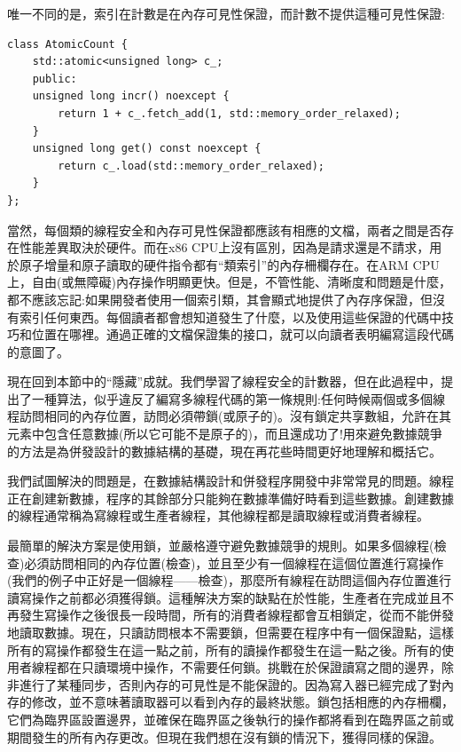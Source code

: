 唯一不同的是，索引在計數是在內存可見性保證，而計數不提供這種可見性保證:

\begin{lstlisting}[style=styleCXX]
class AtomicCount {
	std::atomic<unsigned long> c_;
	public:
	unsigned long incr() noexcept {
		return 1 + c_.fetch_add(1, std::memory_order_relaxed);
	}
	unsigned long get() const noexcept {
		return c_.load(std::memory_order_relaxed);
	}
};
\end{lstlisting}

當然，每個類的線程安全和內存可見性保證都應該有相應的文檔，兩者之間是否存在性能差異取決於硬件。而在x86 CPU上沒有區別，因為是請求還是不請求，用於原子增量和原子讀取的硬件指令都有“類索引”的內存柵欄存在。在ARM CPU上，自由(或無障礙)內存操作明顯更快。但是，不管性能、清晰度和問題是什麼，都不應該忘記:如果開發者使用一個索引類，其會顯式地提供了內存序保證，但沒有索引任何東西。每個讀者都會想知道發生了什麼，以及使用這些保證的代碼中技巧和位置在哪裡。通過正確的文檔保證集的接口，就可以向讀者表明編寫這段代碼的意圖了。

現在回到本節中的“隱藏”成就。我們學習了線程安全的計數器，但在此過程中，提出了一種算法，似乎違反了編寫多線程代碼的第一條規則:任何時候兩個或多個線程訪問相同的內存位置，訪問必須帶鎖(或原子的)。沒有鎖定共享數組，允許在其元素中包含任意數據(所以它可能不是原子的)，而且還成功了!用來避免數據競爭的方法是為併發設計的數據結構的基礎，現在再花些時間更好地理解和概括它。


我們試圖解決的問題是，在數據結構設計和併發程序開發中非常常見的問題。線程正在創建新數據，程序的其餘部分只能夠在數據準備好時看到這些數據。創建數據的線程通常稱為寫線程或生產者線程，其他線程都是讀取線程或消費者線程。

最簡單的解決方案是使用鎖，並嚴格遵守避免數據競爭的規則。如果多個線程(檢查)必須訪問相同的內存位置(檢查)，並且至少有一個線程在這個位置進行寫操作(我們的例子中正好是一個線程——檢查)，那麼所有線程在訪問這個內存位置進行讀寫操作之前都必須獲得鎖。這種解決方案的缺點在於性能，生產者在完成並且不再發生寫操作之後很長一段時間，所有的消費者線程都會互相鎖定，從而不能併發地讀取數據。現在，只讀訪問根本不需要鎖，但需要在程序中有一個保證點，這樣所有的寫操作都發生在這一點之前，所有的讀操作都發生在這一點之後。所有的使用者線程都在只讀環境中操作，不需要任何鎖。挑戰在於保證讀寫之間的邊界，除非進行了某種同步，否則內存的可見性是不能保證的。因為寫入器已經完成了對內存的修改，並不意味著讀取器可以看到內存的最終狀態。鎖包括相應的內存柵欄，它們為臨界區設置邊界，並確保在臨界區之後執行的操作都將看到在臨界區之前或期間發生的所有內存更改。但現在我們想在沒有鎖的情況下，獲得同樣的保證。

